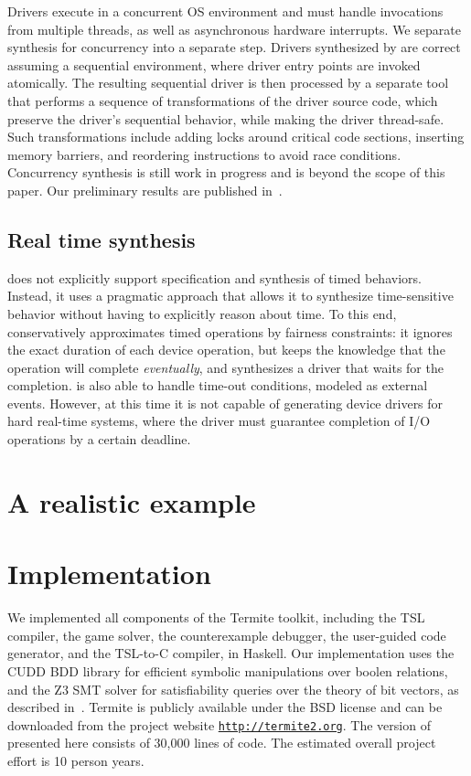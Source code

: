 Drivers execute in a concurrent OS environment and must handle invocations from multiple threads, as well as asynchronous hardware interrupts.  We separate synthesis for concurrency into a separate step.  Drivers synthesized by \termite are correct assuming a sequential environment, where driver entry points are invoked atomically.  The resulting sequential driver is then processed by a separate tool that performs a sequence of transformations of the driver source code, which preserve the driver's sequential behavior, while making the driver thread-safe.  Such transformations include adding locks around critical code sections, inserting memory barriers, and reordering instructions to avoid race conditions.  Concurrency synthesis is still work in progress and is beyond the scope of this paper.  Our preliminary results are published in~\cite{Cerny_HRRT_13, Cerny_HRRT_14}.

\subsection{Real time synthesis}

\termite does not explicitly support specification and synthesis of timed behaviors.  Instead, it uses a pragmatic approach that allows it to synthesize time-sensitive behavior without having to explicitly reason about time.  To this end, \termite conservatively approximates timed operations by fairness constraints: it ignores the exact duration of each device operation, but keeps the knowledge that the operation will complete \emph{eventually}, and synthesizes a driver that waits for the completion.  \termite is also able to handle time-out conditions, modeled as external events.  However, at this time it is not capable of generating device drivers for hard real-time systems, where the driver must guarantee completion of I/O operations by a certain deadline.

\section{A realistic example}

\section{Implementation}

We implemented all components of the Termite toolkit, including the TSL compiler, the game solver, the counterexample debugger, the user-guided code generator, and the TSL-to-C compiler, in Haskell.  Our implementation uses the CUDD BDD library for efficient symbolic manipulations over boolen relations, and the Z3 SMT solver for satisfiability queries over the theory of bit vectors, as described in~\cite{Walker_Ryzhyk_14}.  Termite is publicly available under the BSD license and can be downloaded from the project website \texttt{\url{http://termite2.org}}. The version of \termite presented here consists of 30,000 lines of code.  The estimated overall project effort is 10 person years. 

